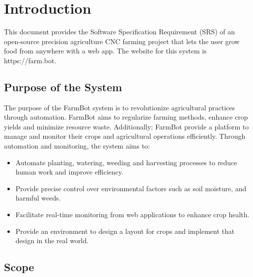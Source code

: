 
\chapter{Introduction} \label{introduction}

This document provides the Software Specification Requirement (SRS) of an open-source precision agriculture CNC farming project that lets the user grow food from anywhere with a web app. The website for this system is https://farm.bot.

\section{Purpose of the System }

The purpose of the FarmBot system is to revolutionize agricultural practices through automation. FarmBot aims to regularize farming methods, enhance crop yields and minimize resource waste. Additionally; FarmBot provide a platform to manage and monitor their crops and agricultural operations efficiently. Through automation and monitoring, the system aims to:

\begin{itemize}
    \item Automate planting, watering, weeding and harvesting processes to reduce human work and improve efficiency.
    \item Provide precise control over environmental factors such as soil moisture, and harmful weeds.
    \item Facilitate real-time monitoring from web applications to enhance crop health.
    \item Provide an environment to design a layout for crops and implement that design in the real world.
\end{itemize}


\section{Scope}

